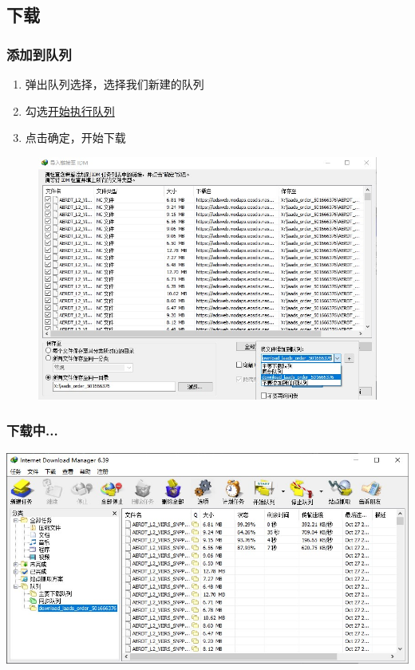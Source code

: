 \subsection{下载}
\begin{frame}
    \frametitle{添加到队列}
    \begin{enumerate}
        \item 弹出队列选择，选择我们新建的队列
        \item 勾选\underline{开始执行队列}
        \item 点击确定，开始下载
    \end{enumerate}
    \begin{figure}
        \includegraphics[width=0.65\linewidth]{images/39.添加到队列}
    \end{figure}
\end{frame}
\begin{frame}
    \frametitle{下载中...}
    \includegraphics[width=\linewidth]{images/40.下载中}
\end{frame}
